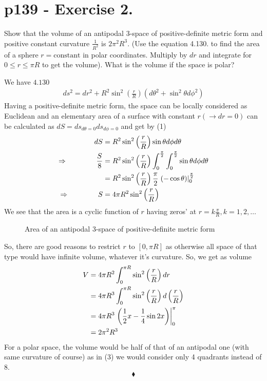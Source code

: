 \section{p139 - Exercise 2.}
\begin{tcolorbox}
Show that the volume of an antipodal 3-space of positive-definite metric form and positive constant curvature $\frac{1}{R^2}$ is $2\pi^2R^3$. (Use the equation 4.130. to find the area of a sphere $r= \text{constant}$ in polar coordinates. Multiply by $dr$ and integrate for $0\leq r \leq \pi R$ to get the volume). What is the volume if the space is polar?
\end{tcolorbox}
We have  $4.130$
\begin{align}
ds^2= dr^2+R^2\sin^2\left(\frac{r}{R}\right)\left(d\theta^2+\sin^2\theta d\phi^2\right)
\end{align}
Having a positive-definite metric form, the space can be locally considered as Euclidean and an elementary area of a  surface with constant $r (\rightarrow dr=0)$ can be calculated as $dS=ds_{d\theta=0}ds_{d\phi=0}$ and get by (1)
\begin{align}
dS &= R^2\sin^2\left(\frac{r}{R}\right)\sin\theta d\phi d\theta\\
\Rightarrow\quad\quad\quad\quad\frac{S}{8} &= R^2\sin^2\left(\frac{r}{R}\right)\int^{\frac{\pi}{2}}_{0}\int^{\frac{\pi}{2}}_{0} \sin\theta d\phi d\theta\\ 
&= R^2\sin^2\left(\frac{r}{R}\right)\frac{\pi}{2} \left.\left(-\cos\theta \right)\right|^{\frac{\pi}{2}}_{0}\\
\Rightarrow\quad\quad\quad\quad S&= 4\pi R^2\sin^2\left(\frac{r}{R}\right)
\end{align}
We see that the area is a cyclic function of $r$ having zeros' at $r= k\frac{\pi}{R }, k=1,2,\dots$
\begin{figure}[H]
\begin{center}

\caption{Area of an antipodal 3-space of positive-definite metric form}
\label{fig:fig_p138_Ex2}
\end{center}
\end{figure}
So, there are good reasons to restrict $r$ to $[0,\pi R]$ as otherwise all space of that type would have infinite volume, whatever it's curvature. So, we get as volume 
\begin{align}
V &= 4\pi R^2\int^{\pi R}_{0}\sin^2\left(\frac{r}{R}\right)dr\\
&= 4\pi R^3\int^{\pi R}_0\sin^2\left(\frac{r}{R}\right)d\left(\frac{r}{R}\right)\\
&= 4\pi R^3\left.\left( \frac{1}{2} x - \frac{1}{4}\sin2x \right)\right|^{\pi}_0\\
&= 2\pi^2 R^3
\end{align}
For a polar space, the volume would be half of that of an antipodal one (with same curvature of course) as in (3) we would consider only 4 quadrants instead of 8.
$$\blacklozenge$$
\newpage


